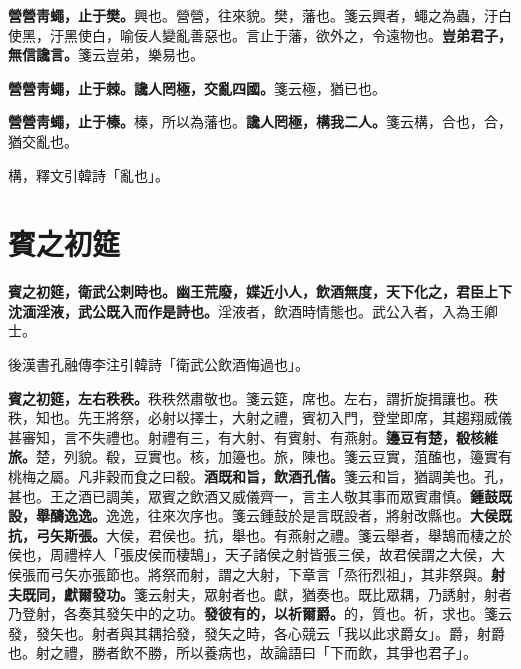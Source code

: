 \textbf{營營靑蠅，止于樊。}{\footnotesize 興也。營營，往來貌。樊，藩也。箋云興者，蠅之為蟲，汙白使黑，汙黑使白，喻佞人變亂善惡也。言止于藩，欲外之，令遠物也。}\textbf{豈弟君子，無信讒言。}{\footnotesize 箋云豈弟，樂易也。}

\textbf{營營靑蠅，止于棘。讒人罔極，交亂四國。}{\footnotesize 箋云極，猶已也。}

\textbf{營營靑蠅，止于榛。}{\footnotesize 榛，所以為藩也。}\textbf{讒人罔極，構我二人。}{\footnotesize 箋云構，合也，合，猶交亂也。}

\begin{quoting}構，釋文引韓詩「亂也」。\end{quoting}

\section{賓之初筵}


\textbf{賓之初筵，衛武公刺時也。幽王荒廢，媟近小人，飲酒無度，天下化之，君臣上下沈湎淫液，武公既入而作是詩也。}{\footnotesize 淫液者，飲酒時情態也。武公入者，入為王卿士。}

\begin{quoting}後漢書孔融傳李注引韓詩「衛武公飲酒悔過也」。\end{quoting}

\textbf{賓之初筵，左右秩秩。}{\footnotesize 秩秩然肅敬也。箋云筵，席也。左右，謂折旋揖讓也。秩秩，知也。先王將祭，必射以擇士，大射之禮，賓初入門，登堂即席，其趨翔威儀甚審知，言不失禮也。射禮有三，有大射、有賓射、有燕射。}\textbf{籩豆有楚，殽核維旅。}{\footnotesize 楚，列貌。殽，豆實也。核，加籩也。旅，陳也。箋云豆實，菹醢也，籩實有桃梅之屬。凡非穀而食之曰殽。}\textbf{酒既和旨，飲酒孔偕。}{\footnotesize 箋云和旨，猶調美也。孔，甚也。王之酒已調美，眾賓之飲酒又威儀齊一，言主人敬其事而眾賓肅慎。}\textbf{鍾鼓既設，舉醻逸逸。}{\footnotesize 逸逸，往來次序也。箋云鍾鼓於是言既設者，將射改縣也。}\textbf{大侯既抗，弓矢斯張。}{\footnotesize 大侯，君侯也。抗，舉也。有燕射之禮。箋云舉者，舉鵠而棲之於侯也，周禮梓人「張皮侯而棲鵠」，天子諸侯之射皆張三侯，故君侯謂之大侯，大侯張而弓矢亦張節也。將祭而射，謂之大射，下章言「烝衎烈祖」，其非祭與。}\textbf{射夫既同，獻爾發功。}{\footnotesize 箋云射夫，眾射者也。獻，猶奏也。既比眾耦，乃誘射，射者乃登射，各奏其發矢中的之功。}\textbf{發彼有的，以祈爾爵。}{\footnotesize 的，質也。祈，求也。箋云發，發矢也。射者與其耦拾發，發矢之時，各心競云「我以此求爵女」。爵，射爵也。射之禮，勝者飲不勝，所以養病也，故論語曰「下而飲，其爭也君子」。}

